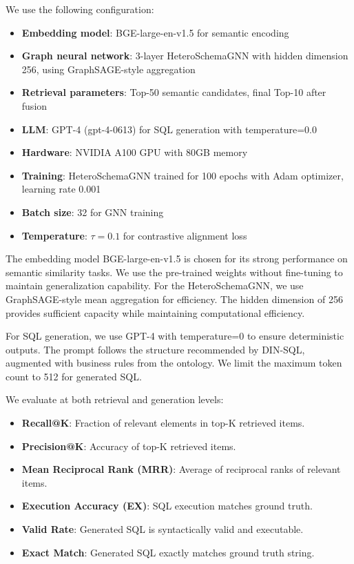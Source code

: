 \documentclass[sigconf, nonatbib]{acmart}
\begin{document}
We use the following configuration:
\begin{itemize}
    \item \textbf{Embedding model}: BGE-large-en-v1.5 for semantic encoding
    \item \textbf{Graph neural network}: 3-layer HeteroSchemaGNN with hidden dimension 256, using GraphSAGE-style aggregation
    \item \textbf{Retrieval parameters}: Top-50 semantic candidates, final Top-10 after fusion
    \item \textbf{LLM}: GPT-4 (gpt-4-0613) for SQL generation with temperature=0.0
    \item \textbf{Hardware}: NVIDIA A100 GPU with 80GB memory
    \item \textbf{Training}: HeteroSchemaGNN trained for 100 epochs with Adam optimizer, learning rate 0.001
    \item \textbf{Batch size}: 32 for GNN training
    \item \textbf{Temperature}: $\tau=0.1$ for contrastive alignment loss
\end{itemize}

The embedding model BGE-large-en-v1.5 is chosen for its strong performance on semantic similarity tasks. We use the pre-trained weights without fine-tuning to maintain generalization capability. For the HeteroSchemaGNN, we use GraphSAGE-style mean aggregation for efficiency. The hidden dimension of 256 provides sufficient capacity while maintaining computational efficiency.

For SQL generation, we use GPT-4 with temperature=0 to ensure deterministic outputs. The prompt follows the structure recommended by DIN-SQL, augmented with business rules from the ontology. We limit the maximum token count to 512 for generated SQL.

We evaluate at both retrieval and generation levels:
\begin{itemize}
    \item \textbf{Recall@K}: Fraction of relevant elements in top-K retrieved items.
    \item \textbf{Precision@K}: Accuracy of top-K retrieved items.
    \item \textbf{Mean Reciprocal Rank (MRR)}: Average of reciprocal ranks of relevant items.
    \item \textbf{Execution Accuracy (EX)}: SQL execution matches ground truth.
    \item \textbf{Valid Rate}: Generated SQL is syntactically valid and executable.
    \item \textbf{Exact Match}: Generated SQL exactly matches ground truth string.
\end{itemize}
\end{document}

